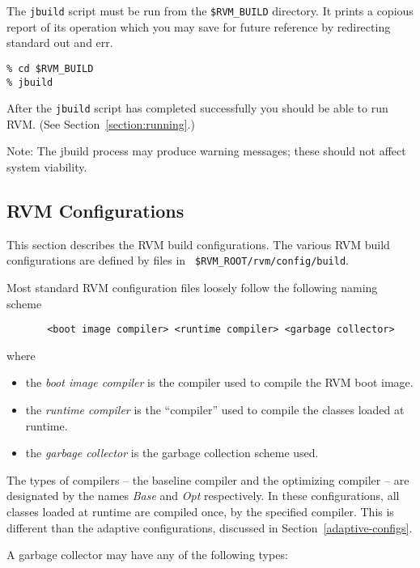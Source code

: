 \begin{enumerate}
The {\tt jbuild} script must be run from the {\tt \$RVM\_BUILD}
directory. It prints a copious report of its operation which you may
save for future reference by redirecting standard out and err.

\begin{verbatim}
% cd $RVM_BUILD
% jbuild
\end{verbatim}


After the {\tt jbuild} script has completed successfully you should be able 
to run RVM.  (See Section~\ref{section:running}.)

Note: The jbuild process may produce warning messages; these should not
affect system viability.

\end{enumerate}

\subsection{RVM Configurations}\label{configs}

This section describes the RVM build configurations.  The various RVM
build configurations are defined by files in {\tt
\$RVM\_ROOT/rvm/config/build}.

Most standard RVM configuration files loosely follow the following naming scheme
\begin{verbatim}
       <boot image compiler> <runtime compiler> <garbage collector>
\end{verbatim}

where
\begin{itemize}
\item the {\em boot image compiler} is the compiler used to compile the RVM boot image.
\item the {\em runtime compiler} is the ``compiler'' used to compile
the classes loaded at runtime.  
\item the {\em garbage collector} is the garbage collection scheme used.
\end{itemize}

The types of compilers -- the baseline compiler and 
the optimizing compiler -- are designated by the names {\em Base}
and {\em Opt} respectively.  In these configurations,
all classes loaded at runtime are compiled once, by the specified
compiler.  This is different than the adaptive configurations,
discussed in Section~\ref{adaptive-configs}.

A garbage collector may have any of the following types:

